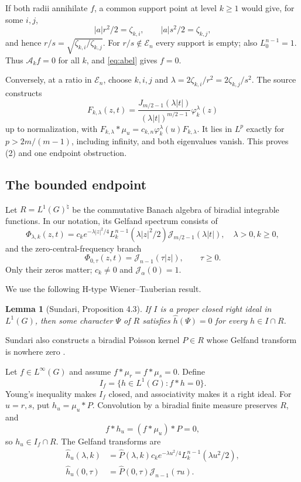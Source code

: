 \documentclass[11pt]{article}
\newtheorem{lemma}{Lemma}
\newcommand{\E}{\mathcal{E}}
\newcommand{\A}{\mathcal{A}}
\newcommand{\J}{\mathscr{J}}
\begin{document}
If both radii annihilate $f$, a common support point at level $k\geq1$
would give, for some $i,j$,
\[
 |a|r^2/2=\zeta_{k,i},\qquad |a|s^2/2=\zeta_{k,j},
\]
and hence $r/s=\sqrt{\zeta_{k,i}/\zeta_{k,j}}$.  For
$r/s\notin\E_n$ every support is empty; also $L_0^{n-1}=1$.  Thus
$\A_kf=0$ for all $k$, and \eqref{eq:abel} gives $f=0$.

Conversely, at a ratio in $\E_n$, choose $k,i,j$ and
$\lambda=2\zeta_{k,i}/r^2=2\zeta_{k,j}/s^2$.  The source constructs
\[
 F_{k,\lambda}(z,t)=
 \frac{J_{m/2-1}(\lambda|t|)}{(\lambda|t|)^{m/2-1}}
 \varphi_k^\lambda(z)
\]
up to normalization, with
$F_{k,\lambda}*\mu_u=c_{k,n}\varphi_k^\lambda(u)F_{k,\lambda}$.
It lies in $L^p$ exactly for $p>2m/(m-1)$, including infinity, and both
eigenvalues vanish.  This proves (2) and one endpoint obstruction.

\subsection{The bounded endpoint}

Let $R=L^1(G)^\natural$ be the commutative Banach algebra of biradial
integrable functions.  In our notation, its Gelfand spectrum
\cite[pp.~5--6]{Sundari} consists of
\[
 \Phi_{\lambda,k}(z,t)=
 c_k e^{-\lambda|z|^2/4}
 L_k^{n-1}(\lambda|z|^2/2)\J_{m/2-1}(\lambda|t|),
 \quad \lambda>0, k\geq0,
\]
and the zero-central-frequency branch
\[
 \Phi_{0,\tau}(z,t)=\J_{n-1}(\tau|z|),\qquad \tau\geq0.
\]
Only their zeros matter; $c_k\neq0$ and $\J_\alpha(0)=1$.

We use the following H-type Wiener--Tauberian result.

\begin{lemma}[Sundari, Proposition 4.3]\label{lem:WT}
If $I$ is a proper closed right ideal in $L^1(G)$, then some character
$\Psi$ of $R$ satisfies $\widehat h(\Psi)=0$ for every $h\in I\cap R$.
\end{lemma}

Sundari also constructs a biradial Poisson kernel $P\in R$ whose Gelfand
transform is nowhere zero \cite[Proposition~4.4]{Sundari}.

Let $f\in L^\infty(G)$ and assume $f*\mu_r=f*\mu_s=0$.  Define
\[
 I_f=\{h\in L^1(G):f*h=0\}.
\]
Young's inequality makes $I_f$ closed, and associativity makes it a right
ideal.  For $u=r,s$, put $h_u=\mu_u*P$.  Convolution by a biradial finite
measure preserves $R$, and
\[
 f*h_u=(f*\mu_u)*P=0,
\]
so $h_u\in I_f\cap R$.  The Gelfand transforms are
\begin{align*}
 \widehat h_u(\lambda,k)
   &=\widehat P(\lambda,k)c_k e^{-\lambda u^2/4}
     L_k^{n-1}(\lambda u^2/2),\\
 \widehat h_u(0,\tau)
   &=\widehat P(0,\tau)\J_{n-1}(\tau u).
\end{align*}
\end{document}
